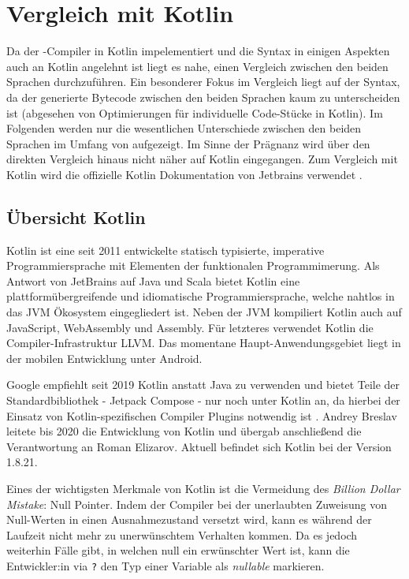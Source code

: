 \chapter{Vergleich mit Kotlin}
\label{cha:comparison}

Da der \toya-Compiler in Kotlin impelementiert und die Syntax in einigen Aspekten auch an Kotlin angelehnt ist liegt es nahe, einen Vergleich zwischen den beiden Sprachen durchzuführen. Ein besonderer Fokus im Vergleich liegt auf der Syntax, da der generierte Bytecode zwischen den beiden Sprachen kaum zu unterscheiden ist (abgesehen von Optimierungen für individuelle Code-Stücke in Kotlin). Im Folgenden werden nur die wesentlichen Unterschiede zwischen den beiden Sprachen im Umfang von \toya aufgezeigt. Im Sinne der Prägnanz wird über den direkten Vergleich hinaus nicht näher auf Kotlin eingegangen. Zum Vergleich mit Kotlin wird die offizielle Kotlin Dokumentation von Jetbrains verwendet \parencite{kotlindocs}.

\section{Übersicht Kotlin}
Kotlin ist eine seit 2011 entwickelte statisch typisierte, imperative Programmiersprache mit Elementen der funktionalen Programmimerung. Als Antwort von JetBrains auf Java und Scala bietet Kotlin eine plattformübergreifende und idiomatische Programmiersprache, welche nahtlos in das JVM Ökosystem eingegliedert ist. Neben der JVM kompiliert Kotlin auch auf JavaScript, WebAssembly und Assembly. Für letzteres verwendet Kotlin die Compiler-Infrastruktur LLVM. Das momentane Haupt-Anwendungsgebiet liegt in der mobilen Entwicklung unter Android.

Google empfiehlt seit 2019 Kotlin anstatt Java zu verwenden und bietet Teile der Standardbibliothek - Jetpack Compose - nur noch unter Kotlin an, da hierbei der Einsatz von Kotlin-spezifischen Compiler Plugins notwendig ist \parencite{kotlinfirst}. Andrey Breslav leitete bis 2020 die Entwicklung von Kotlin und übergab anschließend die Verantwortung an Roman Elizarov. Aktuell befindet sich Kotlin bei der Version 1.8.21.

Eines der wichtigsten Merkmale von Kotlin ist die Vermeidung des \textit{Billion Dollar Mistake}: Null Pointer. Indem der Compiler bei der unerlaubten Zuweisung von Null-Werten in einen Ausnahmezustand versetzt wird, kann es während der Laufzeit nicht mehr zu unerwünschtem Verhalten kommen. Da es jedoch weiterhin Fälle gibt, in welchen null ein erwünschter Wert ist, kann die Entwickler:in via \texttt{?} den Typ einer Variable als \textit{nullable} markieren.


